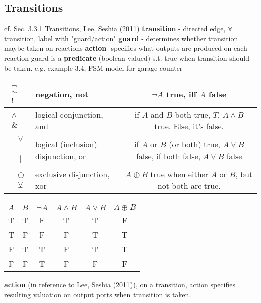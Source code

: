 \documentclass[10pt]{amsart}
\begin{document}
\begin{multicols*}{2}
\subsection{Transitions}
cf. Sec. 3.3.1 Transitions, Lee, Seshia (2011) \cite{LeSe2011}
\textbf{transition} - directed edge, $\forall \, $ transition, label with "guard/action"  
\textbf{guard} - determines whether transition maybe taken on reactions  
\textbf{action} -specifies what outputs are produced on each reaction  
guard is a \textbf{predicate} (boolean valued) s.t. true when transition should be taken.  
e.g. example 3.4, FSM model for garage counter  
\begin{tabular}{l l c}
	$\begin{aligned}
	\neg \\ 
	\sim \\ 
	! 
	\end{aligned}$ & negation, not &  $\neg A$ true, iff $A$ false  \\ \hline
	$\begin{aligned}
	\wedge \\ \& \
	\end{aligned}$ & logical conjunction, and & if $A$ and $B$ both true, $T$, $A \wedge B$ true.  Else, it's false.    \\ \hline 
	$\begin{aligned}
	& \vee \\ & + \\ & \parallel \end{aligned}$ & logical (inclusion) disjunction, or & if $A$ or $B$ (or both) true, $A \vee B$ false, if both false, $A\vee B$ false  
	\\ \hline  
	$\begin{aligned}
	& \oplus \\ 
	& \veebar \end{aligned}$ & exclusive disjunction, xor & $A \oplus B$ true when either $A$ or $B$, but not both are true.    
\end{tabular}
\begin{tabular}{c c c c c c}
	\hline
	$A$ & $B$ & $\neg A$ & $ A\wedge B$ & $A \vee B$ & $A \oplus B$ \\ \hline
	T & T & F & T & T & F  \\
	T & F & F & F & T & T \\ 
	F & T & T & F & T & T \\ 
	F & F & T & F & F & F  
\end{tabular}
\textbf{action} (in reference to Lee, Seshia (2011)), on a transition, action specifies resulting valuation on output ports when transition is taken.  

\end{multicols*}
\end{document}
